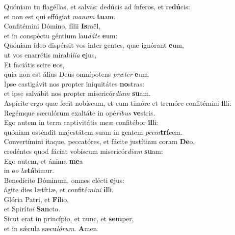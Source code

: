 \evenverse Quóniam tu flagéllas, et salvas: dedúcis ad ínferos, et re\textbf{dú}cis:~\*\\
\evenverse et non est qui effúgiat \textit{ma}\textit{num} \textbf{tu}am.\\
\oddverse Confitémini Dómino, fílii \textbf{Is}raël,~\*\\
\oddverse et in conspéctu géntium lau\textit{dá}\textit{te} \textbf{e}um:\\
\evenverse Quóniam ídeo dispérsit vos inter gentes, quæ ignórant \textbf{e}um,~\*\\
\evenverse ut vos enarrétis mirabí\textit{li}\textit{a} \textbf{e}jus,\\
\oddverse Et faciátis scire \textbf{e}os,~\*\\
\oddverse quia non est álius Deus omnípotens \textit{præ}\textit{ter} \textbf{e}um.\\
\evenverse Ipse castigávit nos propter iniquitátes \textbf{no}stras:~\*\\
\evenverse et ipse salvábit nos propter misericór\textit{di}\textit{am} \textbf{su}am.\\
\oddverse Aspícite ergo quæ fecit nobíscum, et cum timóre et tremóre confitémini \textbf{il}li:~\*\\
\oddverse Regémque sæculórum exaltáte in opé\textit{ri}\textit{bus} \textbf{ve}stris.\\
\evenverse Ego autem in terra captivitátis meæ confitébor \textbf{il}li:~\*\\
\evenverse quóniam osténdit majestátem suam in gentem \textit{pec}\textit{ca}\textbf{trí}cem.\\
\oddverse Convertímini ítaque, peccatóres, et fácite justítiam coram \textbf{De}o,~\*\\
\oddverse credéntes quod fáciat vobíscum misericór\textit{di}\textit{am} \textbf{su}am:\\
\evenverse Ego autem, et ánima \textbf{me}a~\*\\
\evenverse in e\textit{o} \textit{læ}\textbf{tá}bimur.\\
\oddverse Benedícite Dóminum, omnes elécti \textbf{e}jus:~\*\\
\oddverse ágite dies lætítiæ, et confité\textit{mi}\textit{ni} \textbf{il}li.\\
\evenverse Glória Patri, et \textbf{Fí}lio,~\*\\
\evenverse et Spirí\textit{tu}\textit{i} \textbf{San}cto.\\
\oddverse Sicut erat in princípio, et nunc, et \textbf{sem}per,~\*\\
\oddverse et in sǽcula sæcu\textit{ló}\textit{rum}. \textbf{A}men.\\
